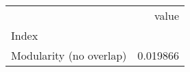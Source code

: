 \begin{tabular}{lr}
\toprule
{} &     value \\
Index                   &           \\
\midrule
Modularity (no overlap) &  0.019866 \\
\bottomrule
\end{tabular}
